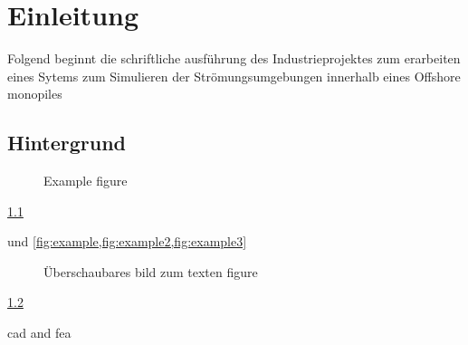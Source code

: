
\chapter{Einleitung}
Folgend beginnt die schriftliche ausführung des Industrieprojektes zum erarbeiten eines Sytems zum Simulieren der Strömungsumgebungen innerhalb eines Offshore monopiles 

\section{Hintergrund}
\begin{figure}[ht]
  \centering
  \caption{Example figure}
  \label{fig:example} %
\end{figure}

\cref{fig:example}

\cite{xeinstein} und \cref{fig:example,fig:example2,fig:example3}

\begin{figure}[ht]
  \centering
  \caption{Überschaubares bild zum texten figure}
  \label{fig:example2} %
\end{figure}

\cref{fig:example2}

\ac{cad}
and \ac{fea}